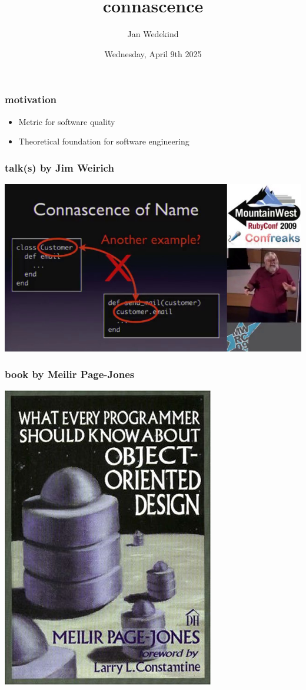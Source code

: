 \documentclass[aspectratio=169,12pt]{beamer}
\title{connascence}
\author{Jan Wedekind}
\date{Wednesday, April 9th 2025}
\begin{document}
\frame{\titlepage}

\begin{frame}
  \frametitle{motivation}
  \begin{itemize}
    \item Metric for software quality
    \item Theoretical foundation for software engineering
  \end{itemize}
\end{frame}

\begin{frame}
  \frametitle{talk(s) by Jim Weirich}
  \begin{center}
    \href{https://www.youtube.com/watch?v=q85rdBMe9GY}{\includegraphics[height=.8\textheight]{weirich}}
  \end{center}
\end{frame}

\begin{frame}
  \frametitle{book by Meilir Page-Jones}
  \begin{center}
    \includegraphics[height=.8\textheight]{meilir}
  \end{center}
\end{frame}
\end{document}
